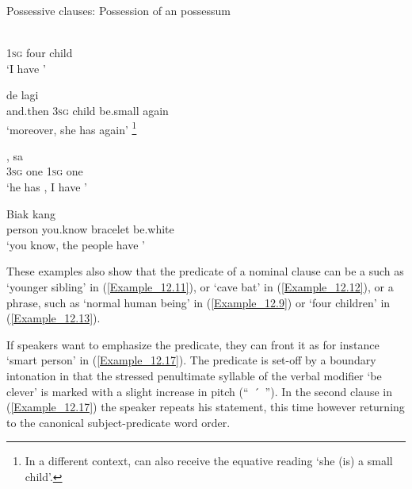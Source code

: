 \begin{styleExampleTitle}
Possessive clauses: Possession of an  possessum
\end{styleExampleTitle}

\ea
\label{Example_12.13}
 {} {}\\ %
 \textsc{1sg}  four  child\\
\glt 
‘I have ’ \textstyleExampleSource{[081006-024-CvEx.0001]}
\z

\ea
\label{Example_12.14}
 {de} {} {} {lagi}\\ %
 and.then  \textsc{3sg}  child  be.small  again\\
\glt 
‘moreover, she has  again’ \textstyleExampleSource{[081010-001-Cv.0070]}\footnote{In a different context,  can also receive the equative reading ‘she (is) a small child’.}
\z

\ea
\label{Example_12.15}
 {,} {sa} {}\\ %
 \textsc{3sg}  one  \textsc{1sg}  one\\
 ‘he has , I have ’ \textstyleExampleSource{[081109-011-JR.0008]}
\z

\ea
\label{Example_12.16}
 {Biak} {kang} {} {}\\ %
 person    you.know  bracelet  be.white\\
 ‘you know, the  people have ’ \textstyleExampleSource{[081006-029-CvEx.0007]}
\z


These examples also show that the predicate of a nominal clause can be a  such as  ‘younger sibling’ in (\ref{Example_12.11}), or  ‘cave bat’ in (\ref{Example_12.12}), or a  phrase, such as  ‘normal human being’ in (\ref{Example_12.9}) or  ‘four children’ in (\ref{Example_12.13}).



If speakers want to emphasize the predicate, they can front it as for instance  ‘smart person’ in (\ref{Example_12.17}). The predicate is set-off by a boundary intonation in that the stressed penultimate syllable of the verbal modifier  ‘be clever’ is marked with a slight increase in pitch (“~\'{~}~”). In the second clause in (\ref{Example_12.17}) the speaker repeats his statement, this time however returning to the canonical subject-predicate word order.


